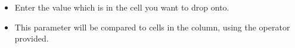 
\begin{itemize}
\item Enter the value which is in the cell you want to drop onto.
\item This parameter will be compared to cells in the column, using the operator provided.
\end{itemize}
